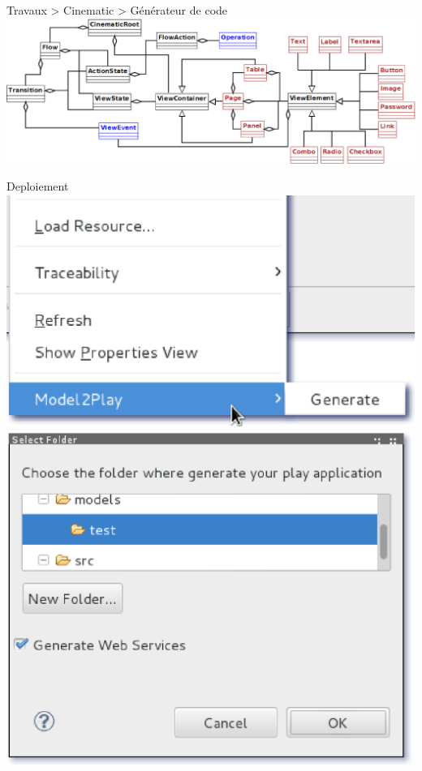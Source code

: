\documentclass[HeilHazel,pdf,final,colorBG,slideColor]{prosper}
\begin{document}
\begin{slide}{Travaux > Cinematic > Générateur de code}
    \includegraphics[scale=.3]{img/cinematic_exp2.eps} 
\end{slide}

\begin{slide}[Box]{Deploiement}
  \bc{}
    \includegraphics[scale=.4]{img/screen_menu.eps}\includegraphics[scale=.35]{img/screen_ui.eps} 
  \ec{}
\end{slide}
\end{document}
